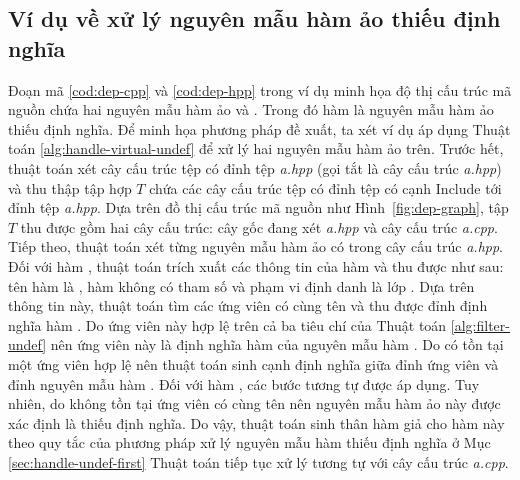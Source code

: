 \subsection*{Ví dụ về xử lý nguyên mẫu hàm ảo thiếu định nghĩa}
Đoạn mã \ref{cod:dep-cpp} và \ref{cod:dep-hpp} trong ví dụ minh họa độ thị cấu trúc mã nguồn chứa hai nguyên mẫu hàm ảo  và . Trong đó hàm  là nguyên mẫu hàm ảo thiếu định nghĩa. Để minh họa phương pháp đề xuất, ta xét ví dụ áp dụng Thuật toán \ref{alg:handle-virtual-undef} để xử lý hai nguyên mẫu hàm ảo trên. Trước hết, thuật toán xét cây cấu trúc tệp có đỉnh tệp \textit{a.hpp} (gọi tắt là cây cấu trúc \textit{a.hpp}) và thu thập tập hợp $T$ chứa các cây cấu trúc tệp có đỉnh tệp có cạnh Include tới đỉnh tệp \textit{a.hpp}. Dựa trên đồ thị cấu trúc mã nguồn như Hình~\ref{fig:dep-graph}, tập $T$ thu được gồm hai cây cấu trúc: cây gốc đang xét \textit{a.hpp} và cây cấu trúc \textit{a.cpp}. Tiếp theo, thuật toán xét từng nguyên mẫu hàm ảo có trong cây cấu trúc \textit{a.hpp}. Đối với hàm , thuật toán trích xuất các thông tin của hàm và thu được như sau: tên hàm là , hàm không có tham số và phạm vi định danh là lớp . Dựa trên thông tin này, thuật toán tìm các ứng viên có cùng tên  và thu được đỉnh định nghĩa hàm . Do ứng viên này hợp lệ trên cả ba tiêu chí của Thuật toán \ref{alg:filter-undef} nên ứng viên này là định nghĩa hàm của nguyên mẫu hàm . Do có tồn tại một ứng viên hợp lệ nên thuật toán sinh cạnh định nghĩa giữa đỉnh ứng viên và đỉnh nguyên mẫu hàm . Đối với hàm , các bước tương tự được áp dụng. Tuy nhiên, do không tồn tại ứng viên có cùng tên  nên nguyên mẫu hàm ảo này được xác định là thiếu định nghĩa. Do vậy, thuật toán sinh thân hàm giả cho hàm này theo quy tắc của phương pháp xử lý nguyên mẫu hàm thiếu định nghĩa ở Mục \ref{sec:handle-undef-first} Thuật toán tiếp tục xử lý tương tự với cây cấu trúc \textit{a.cpp}. 

%    

